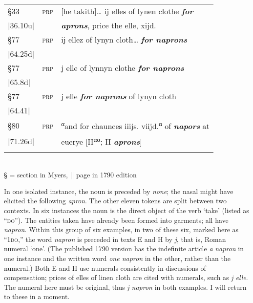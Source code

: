 \documentclass[output=paper,
modfonts
]{LSP/langsci}
\begin{document}
\begin{table}[ht]
\begin{tabular}{lll}
§33 &	\textsc{prp}	&	{[}he takith{]}\ldots{} ij elles of lynen clothe \emph{\textbf{for}}  \\
|36.10u| & & \emph{\textbf{aprons}}, price the elle, xijd. \\

§77 &	\textsc{prp}	&	ij ellez of lynyn cloth\ldots{} \textbf{\emph{for naprons}} \\
|64.25d| & & \\

§77 &	\textsc{prp}	&	 j elle of lynnyn clothe \emph{\textbf{for naprons}}	\\
|65.8d| & & \\

§77 &	\textsc{prp}	&	j elle \emph{\textbf{for naprons}} of lynyn cloth \\
|64.41| & & \\

§80 &	\textsc{prp}	&	\textsuperscript{α}and for chaunces iiijs. viijd.\textsuperscript{α} of \emph{\textbf{napors}} at \\
|71.26d| & &  euerye {[}H\textsuperscript{αα}; H \emph{\textbf{aprons}}{]} \\
\lspbottomrule
\end{tabular}
\\
§ = section in Myers, || page in 1790 edition
\end{table}

In one isolated instance, the noun is preceded by \emph{none}; the nasal
might have elicited the following \emph{apron}. The other eleven tokens
are split between two contexts. In six instances the noun is the direct
object of the verb `take' (listed as ``\textsc{do}''). The entities
taken have already been formed into garments; all have \emph{napron}.
Within this group of six examples, in two of these six, marked here as
``1\textsc{do},'' the word \emph{napron} is preceded in texts E and H by
\emph{j}, that is, Roman numeral `one'. (The published 1790 version has
the indefinite article \emph{a} \emph{napron} in one instance and the
written word \emph{one napron} in the other, rather than the numeral.)
Both E and H use numerals consistently in discussions of compensation;
prices of elles of linen cloth are cited with numerals, such as \emph{j
elle}. The numeral here must be original, thus \emph{j napron} in both
examples. I will return to these in a moment.
\end{document}
